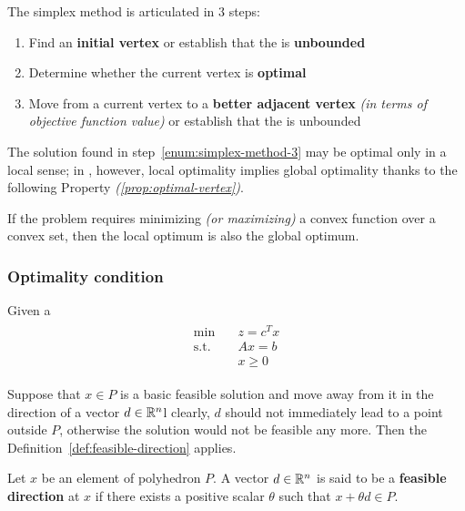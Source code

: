 \documentclass[english]{article}
\begin{document}
The simplex method is articulated in \(3\) steps:

\begin{enumerate}[label=\arabic*., ref=(\arabic*)]
  \item Find an \textbf{initial vertex} or establish that the \LP is \textbf{unbounded}
  \item Determine whether the current vertex is \textbf{optimal}
  \item \label{enum:simplex-method-3} Move from a current vertex to a \textbf{better adjacent vertex} \textit{(in terms of objective function value)} or establish that the \LP is unbounded
\end{enumerate}

\bigskip
The solution found in step~\ref{enum:simplex-method-3} may be optimal only in a local sense;
in \LP, however, local optimality implies global optimality thanks to the following Property \textit{(\ref{prop:optimal-vertex})}.

\begin{property}
  If the \LP problem requires minimizing \textit{(or maximizing)} a convex function over a convex set, then the local optimum is also the global optimum.
  \label{prop:optimal-vertex}
\end{property}

\subsubsection{Optimality condition}

Given a \LP
\begin{gather*}
  \begin{aligned}
    \min \quad        & z = c^T x \\
    \text{s.t.} \quad & Ax = b    \\
                      & x \geq 0
  \end{aligned}
\end{gather*}

Suppose that \(x \in P\) is a basic feasible solution and move away from it in the direction of a vector \(d \in \mathbb{R}^n\)l
clearly, \(d\) should not immediately lead to a point outside \(P\), otherwise the solution would not be feasible any more.
Then the Definition~\ref{def:feasible-direction} applies.

\begin{definition}
  Let \(x\) be an element of polyhedron \(P\).
  A vector \(d \in \mathbb{R}^n\) is said to be a \textbf{feasible direction} at \(x\) if there exists a positive scalar \(\theta\) such that \(x + \theta d \in P\).
  \label{def:feasible-direction}
\end{definition}
\end{document}
